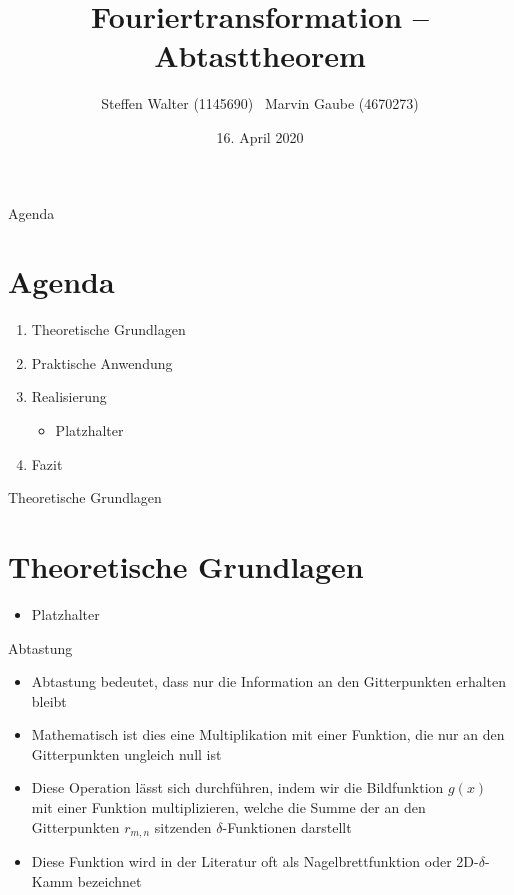 \documentclass{beamer}
\title{Fouriertransformation -- Abtasttheorem}
\author{Steffen Walter (1145690) \ Marvin Gaube (4670273)}
\institute{Duale Hochschule Baden-Württemberg -- Stuttgart\newline Vorlesung: Digitale Bildverarbeitung}
\date{16. April 2020}
\begin{document}
	\maketitle
	\begin{frame}{Agenda}
		\section{Agenda}
		\begin{enumerate}
			\item Theoretische Grundlagen
			\item Praktische Anwendung
			\item Realisierung
			\begin{itemize}
				\item Platzhalter
			\end{itemize}
			\item Fazit
		\end{enumerate}
	\end{frame}

	
	\begin{frame}{Theoretische Grundlagen}
	\section{Theoretische Grundlagen}
	\nocite{bildverarbeitung}
	\begin{itemize}
		\item Platzhalter
	\end{itemize}
	\end{frame}

	\begin{frame}{Abtastung}
	\begin{itemize}
		\item Abtastung bedeutet, dass nur die Information an den Gitterpunkten erhalten bleibt
		\item Mathematisch ist dies eine Multiplikation mit einer Funktion, die nur an den Gitterpunkten ungleich null ist
		\item Diese Operation lässt sich durchführen, indem wir die Bildfunktion $g(x)$ mit einer Funktion multiplizieren, welche die Summe der an den Gitterpunkten $r_{m,n}$ sitzenden $\delta$-Funktionen darstellt
		\item Diese Funktion wird in der Literatur oft als Nagelbrettfunktion oder 2D-$\delta$-Kamm bezeichnet
	\end{itemize}
	
	\end{frame}
\end{document}
